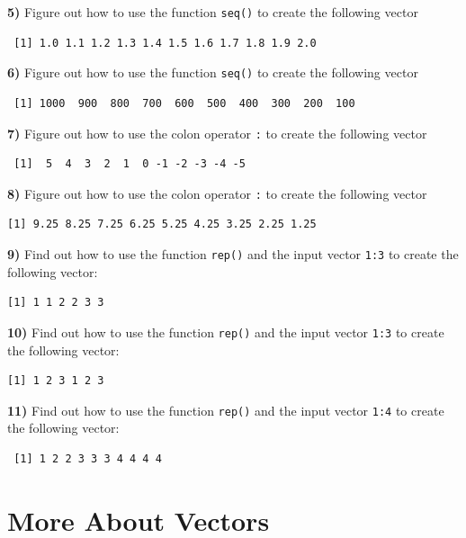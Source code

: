 \documentclass[
]{book}
\begin{document}
\textbf{5)} Figure out how to use the function \texttt{seq()} to create the following vector

\begin{verbatim}
 [1] 1.0 1.1 1.2 1.3 1.4 1.5 1.6 1.7 1.8 1.9 2.0
\end{verbatim}

\textbf{6)} Figure out how to use the function \texttt{seq()} to create the following vector

\begin{verbatim}
 [1] 1000  900  800  700  600  500  400  300  200  100
\end{verbatim}

\textbf{7)} Figure out how to use the colon operator \texttt{:} to create the following vector

\begin{verbatim}
 [1]  5  4  3  2  1  0 -1 -2 -3 -4 -5
\end{verbatim}

\textbf{8)} Figure out how to use the colon operator \texttt{:} to create the following vector

\begin{verbatim}
[1] 9.25 8.25 7.25 6.25 5.25 4.25 3.25 2.25 1.25
\end{verbatim}

\textbf{9)} Find out how to use the function \texttt{rep()} and the input vector \texttt{1:3} to
create the following vector:

\begin{verbatim}
[1] 1 1 2 2 3 3
\end{verbatim}

\textbf{10)} Find out how to use the function \texttt{rep()} and the input vector \texttt{1:3} to
create the following vector:

\begin{verbatim}
[1] 1 2 3 1 2 3
\end{verbatim}

\textbf{11)} Find out how to use the function \texttt{rep()} and the input vector \texttt{1:4} to
create the following vector:

\begin{verbatim}
 [1] 1 2 2 3 3 3 4 4 4 4
\end{verbatim}

\hypertarget{vectors4}{%
\chapter{More About Vectors}\label{vectors4}}
\end{document}
